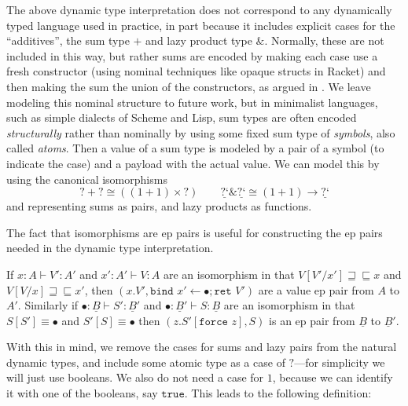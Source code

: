 \documentclass[acmsmall,screen,12pt]{acmart}
\renewcommand{\u}{\underline}
\newcommand{\ltdyn}{\sqsubseteq}
\newcommand{\gtdyn}{\sqsupseteq}
\newcommand{\equidyn}{\mathrel{\gtdyn\ltdyn}}
\newcommand{\dynv}{{?}}
\newcommand{\dync}{\u {\text{?`}}}
\newcommand{\bindXtoYinZ}[2]{\kw{bind}#2 \leftarrow #1;}
\newcommand{\kw}[1]{\texttt{#1}\,\,}
\newcommand{\ret}{\kw{ret}}
\newcommand{\force}{\kw{force}}
\newcommand{\with}{\mathbin{\&}}
\begin{document}
The above dynamic type interpretation does not correspond to any
dynamically typed language used in practice, in part because it
includes explicit cases for the ``additives'', the sum type $+$ and
lazy product type $\with$.
%
Normally, these are not included in this way, but rather sums are
encoded by making each case use a fresh constructor (using nominal
techniques like opaque structs in Racket) and then making the sum the
union of the constructors, as argued in \citet{siekth16recursiveunion}.
%
We leave modeling this nominal structure to future work, but in
minimalist languages, such as simple dialects of Scheme and Lisp, sum
types are often encoded \emph{structurally} rather than nominally by
using some fixed sum type of \emph{symbols}, also called \emph{atoms}.
%
Then a value of a sum type is modeled by a pair of a symbol (to indicate
the case) and a payload with the actual value.
%
We can model this by using the canonical isomorphisms
\[ \dynv + \dynv \cong ((1+1) \times \dynv) \qquad \dync \with \dync \cong (1+1) \to \dync \]
and representing sums as pairs, and lazy products as functions.
\begin{longonly}
The fact that isomorphisms are ep pairs is useful for constructing the
ep pairs needed in the dynamic type interpretation.  
\begin{lemma}
  \label{lem:isos-are-ep}
  If $x:A \vdash V' : A'$ and $x':A' \vdash V : A$ are an isomorphism in
  that $V[V'/x'] \equidyn x$ and $V[V/x]\equidyn x'$, then $(x.V',
  \bindXtoYinZ \bullet {x'} \ret V')$ are a value ep pair from $A$ to
  $A'$.  Similarly if $\bullet : \u B \vdash S' : \u B'$ and $\bullet :
  \u B' \vdash S : \u B$ are an isomorphism in that $S[S']\equiv
  \bullet$ and $S'[S] \equiv \bullet$ then $(z. S'[\force z], S)$ is an
  ep pair from $\u B$ to $\u B'$.
\end{lemma}
\end{longonly}

With this in mind, we remove the cases for sums and lazy pairs from the
natural dynamic types, and include some atomic type as a case of
$\dynv$---for simplicity we will just use booleans.
%
We also do not need a case for $1$, because we can identify it with one
of the booleans, say $\texttt{true}$.
%
This leads to the following definition:
\end{document}
